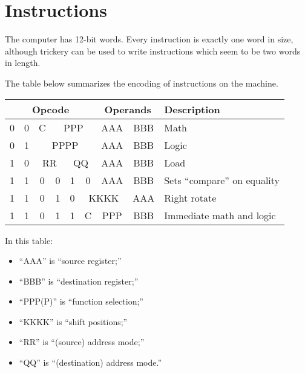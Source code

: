 \documentclass[10pt]{article}
\begin{document}
\maketitle

\section{Instructions}

The computer has 12-bit words.  Every instruction is exactly one word in size, although trickery can be used to write instructions which seem to be two words in length.

The table below summarizes the encoding of instructions on the machine.

\begin{tabular}{|c|c|c|c|c|c||c|c|c|c|c|c||l|}
\hline
\multicolumn{6}{|c||}{Opcode} & \multicolumn{6}{c||}{Operands} & Description \\
\hline
\hline
0 & 0 & C & \multicolumn{3}{c||}{PPP} & \multicolumn{3}{c|}{AAA} & \multicolumn{3}{c||}{BBB} & Math\\
\hline
0 & 1 & \multicolumn{4}{c||}{PPPP} & \multicolumn{3}{c|}{AAA} & \multicolumn{3}{c||}{BBB} & Logic \\
\hline
1 & 0 & \multicolumn{2}{c|}{RR} & \multicolumn{2}{c||}{QQ} & \multicolumn{3}{c|}{AAA} & \multicolumn{3}{c||}{BBB} & Load \\
\hline
1 & 1 & 0 & 0 & 1 & 0 & \multicolumn{3}{c|}{AAA} & \multicolumn{3}{c||}{BBB} & Sets ``compare'' on equality \\
\hline
1 & 1 & 0 & 1 & 0 & \multicolumn{4}{c|}{KKKK} & \multicolumn{3}{c||}{AAA} & Right rotate \\
\hline
1 & 1 & 0 & 1 & 1 & C & \multicolumn{3}{c|}{PPP} & \multicolumn{3}{c||}{BBB} & Immediate math and logic \\
\hline
\end{tabular}

In this table:
\begin{itemize}
\item ``AAA'' is ``source register;''
\item ``BBB'' is ``destination register;''
\item ``PPP(P)'' is ``function selection;''
\item ``KKKK'' is ``shift positions;''
\item ``RR'' is ``(source) address mode;''
\item ``QQ'' is ``(destination) address mode.''
\end{itemize}
\end{document}
